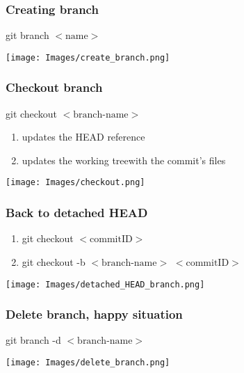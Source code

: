 \documentclass{beamer}
\begin{document}
	\begin{frame}[plain]
		\frametitle{Creating branch}
		
		\begin{center}
			git branch $<\text{name}>$
		\end{center}
		
		\begin{center}
			\texttt{[image: Images/create\_branch.png]}
		\end{center}
	
	\end{frame}

	\begin{frame}[plain]
		\frametitle{Checkout branch}
		
		\begin{center}
			git checkout $<\text{branch-name}>$
		\end{center}

		\begin{enumerate}
			\item updates the HEAD reference
			\item updates the working treewith the commit's files
		\end{enumerate}

		\begin{center}
			\texttt{[image: Images/checkout.png]}
		\end{center}
	\end{frame}

	\begin{frame}[plain]
		\frametitle{Back to detached HEAD}
		\begin{enumerate}
			\item git checkout $<\text{commitID}>$
			\item git checkout -b $<\text{branch-name}>$ $<\text{commitID}>$
		\end{enumerate}
		\begin{center}
			\texttt{[image: Images/detached\_HEAD\_branch.png]}
		\end{center}
		
	\end{frame}

	\begin{frame}[plain]
		\frametitle{Delete branch, happy situation}
	
		\begin{center}
			git branch -d $<\text{branch-name}>$
		\end{center}
		
		\begin{center}
			\texttt{[image: Images/delete\_branch.png]}
		\end{center}
	\end{frame}
\end{document}
